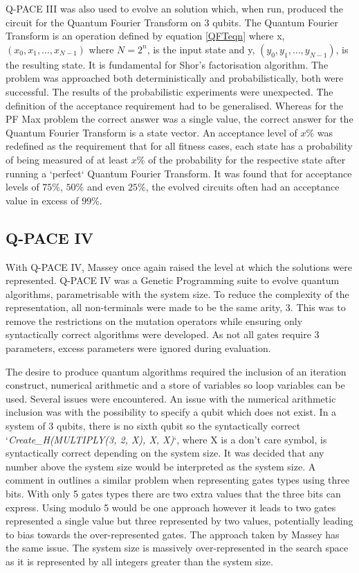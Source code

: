 Q-PACE III was also used to evolve an solution which, when run, produced the circuit for the Quantum Fourier Transform on 3 qubits.
The Quantum Fourier Transform is an operation defined by equation \ref{QFTeqn} where x, $(x_0, x_1, \ldots, x_{N-1})$ where $N = 2^n$, is the input state and y, $(y_0, y_1, \ldots, y_{N-1})$, is the resulting state.
It is fundamental for Shor's factorisation algorithm.
The problem was approached both deterministically and probabilistically, both were successful.
The results of the probabilistic experiments were unexpected.
The definition of the acceptance requirement had to be generalised.
Whereas for the PF Max problem the correct answer was a single value, the correct answer for the Quantum Fourier Transform is a state vector.
An acceptance level of $x\%$ was redefined as the requirement that for all fitness cases, each state has a probability of being measured of at least $x\%$ of the probability for the respective state after running a `perfect` Quantum Fourier Transform.
It was found that for acceptance levels of $75\%$, $50\%$ and even $25\%$, the evolved circuits often had an acceptance value in excess of $99\%$.

\subsection{Q-PACE IV}
With Q-PACE IV, Massey once again raised the level at which the solutions were represented.
Q-PACE IV was a Genetic Programming suite to evolve quantum algorithms, parametrisable with the system size.
To reduce the complexity of the representation, all non-terminals were made to be the same arity, 3.
This was to remove the restrictions on the mutation operators while ensuring only syntactically correct algorithms were developed.
As not all gates require 3 parameters, excess parameters were ignored during evaluation.

The desire to produce quantum algorithms required the inclusion of an iteration construct, numerical arithmetic and a store of variables so loop variables can be used.
Several issues were encountered.
An issue with the numerical arithmetic inclusion was with the possibility to specify a qubit which does not exist.
In a system of 3 qubits, there is no sixth qubit so the syntactically correct `\emph{Create\_H(MULTIPLY(3, 2, X), X, X)}`\cite{masseythesis}, where X is a don't care symbol, is syntactically correct depending on the system size.
It was decided that any number above the system size would be interpreted as the system size.
A comment in \cite{Stepney07searchingfor} outlines a similar problem when representing gates types using three bits.
With only 5 gates types there are two extra values that the three bits can express.
Using modulo 5 would be one approach however it leads to two gates represented a single value but three represented by two values, potentially leading to bias towards the over-represented gates.
The approach taken by Massey has the same issue.
The system size is massively over-represented in the search space as it is represented by all integers greater than the system size.

